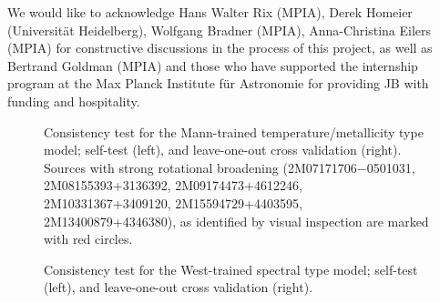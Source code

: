 \documentclass[preprint]{aastex62}
\begin{document}
\acknowledgements
We would like to acknowledge Hans Walter Rix (MPIA), Derek Homeier (Universit{\"a}t Heidelberg), Wolfgang Bradner (MPIA), Anna-Christina Eilers (MPIA) for constructive discussions in the process of this project, as well as Bertrand Goldman (MPIA) and those who have supported the internship program at the Max Planck Institute f{\"u}r Astronomie for providing JB with funding and hospitality. \color{gcolor}{HOGG: SDSS acknowledgments... Grants and stuff...}\color{black}  


\newpage

\begin{figure}[ht]
\caption{Consistency test for the Mann-trained temperature/metallicity type model; self-test (left), and leave-one-out cross validation (right). Sources with strong rotational broadening (2M07171706−0501031, 2M08155393+3136392, 2M09174473+4612246, 2M10331367+3409120, 2M15594729+4403595, 2M13400879+4346380), as identified by visual inspection are marked with red circles.} \label{fig:mann_validation}
\end{figure}

\begin{figure}[ht]
\begin{center}
\end{center}
\caption{Consistency test for the West-trained spectral type model; self-test (left), and leave-one-out cross validation (right).} \label{fig:west_validation}
\end{figure}
\end{document}
